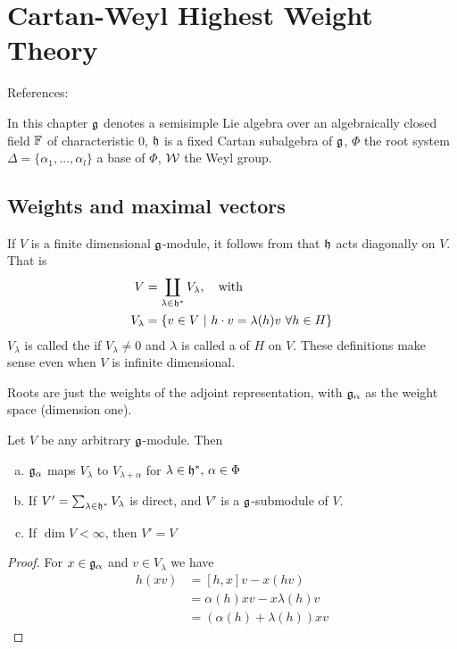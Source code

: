\chapter{Cartan-Weyl Highest Weight Theory}
\label{cha:cartan_weyl_highest_weight_theory}
References: \cite[$\S 20$]{humphreys1972introduction}

In this chapter $\mathfrak{g}$ denotes a semisimple Lie algebra over an algebraically closed field $\mathbb{F}$ of characteristic $0$, $\mathfrak{h}$ is a fixed Cartan subalgebra of $\mathfrak{g}$, $\Phi$ the root system $\Delta = \{\alpha_1,\dotsc,\alpha_l\}$ a base of $\Phi$, $\mathcal{W}$ the Weyl group.

\section{Weights and maximal vectors}
\label{sec:weights_and_maximal_vectors}

If $V$ is a finite dimensional $\mathfrak{g}$-module, it follows from   that $\mathfrak{h}$ acts diagonally on $V$. That is 
\begin{align}
    V &= \coprod_{\lambda\in \mathfrak{h}^* } V_\lambda, \quad \text{with}\\
    V_\lambda &= \{v\in V\ |\ h\cdot v = \lambda(h) v \ \forall h\in H\}
\end{align}
$V_\lambda$ is called the  if $V_\lambda\neq 0$ and $\lambda$ is called a  of $H$ on $V$. 
These definitions make sense even when $V$ is infinite dimensional.
\begin{insight}
    Roots are just the weights of the adjoint representation, with $\mathfrak{g}_\alpha$  as the weight space (dimension one).
\end{insight}

\begin{lemma}
    Let $V$ be any arbitrary $\mathfrak{g}$-module. Then
    \begin{enumerate}[(a)]
        \makethislistcompact
        \item 
            $\mathfrak{g}_\alpha$ maps $V_\lambda$ to $V_{\lambda+\alpha}$ for $\lambda\in \mathfrak{h}^*,\,\alpha\in\Phi$
        \item 
            If $V'=\sum_{\lambda\in \mathfrak{h}^*} V_\lambda$ is direct, and $V'$ is a $\mathfrak{g}$-submodule of $V$.
        \item
            If $\dim V < \infty$, then $V'=V$
    \end{enumerate}
\end{lemma}
\begin{proof}
    For $x\in \mathfrak{g}_\alpha$ and $v\in V_\lambda$  we have
    \begin{align*}
        h(xv) &= [h,x]v - x(hv)\\
            &= \alpha(h)xv - x\lambda(h)v \\
            &= (\alpha(h) + \lambda(h)) xv
    \end{align*}
\end{proof}

